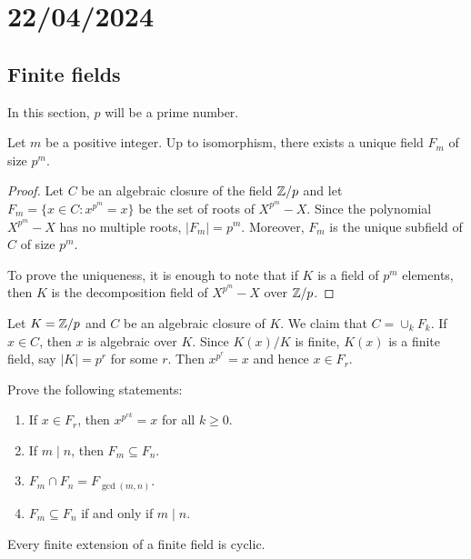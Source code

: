 \section{22/04/2024}

\subsection{Finite fields}

In this section, $p$ will be a prime number. 

\begin{proposition}
    Let $m$ be a positive integer. 
    Up to isomorphism, there exists a unique 
    field $F_m$ of size $p^m$. 
\end{proposition}

\begin{proof}
    Let $C$ be an algebraic closure of the field $\mathbb{Z}/p$ and 
    let $F_m=\{x\in C:x^{p^m}=x\}$ be the set of roots of $X^{p^m}-X$. Since 
    the polynomial $X^{p^m}-X$ has no multiple roots, $|F_m|=p^m$. Moreover, 
    $F_m$ is the unique subfield of $C$ of size $p^m$. 
    
    To prove the uniqueness, it is enough to note that 
    if $K$ is a field of $p^m$ elements, then
    $K$ is the decomposition field of $X^{p^m}-X$ over $\mathbb{Z}/p$.  
\end{proof}

Let $K=\mathbb{Z}/p$ and $C$ be an algebraic closure of $K$. 
We claim that $C=\cup_k F_k$. If $x\in C$, then $x$ is algebraic over $K$. 
Since $K(x)/K$ is finite, $K(x)$ is a finite field, say 
$|K|=p^r$ for some $r$. Then $x^{p^r}=x$ and hence $x\in F_r$. 

\begin{exercise}
    Prove the following statements:
    \begin{enumerate}
        \item If $x\in F_r$, then $x^{p^{rk}}=x$ for all $k\geq0$.
        \item If $m\mid n$, then $F_m\subseteq F_n$. 
        \item $F_m\cap F_n=F_{\gcd(m,n)}$.
        \item $F_m\subseteq F_n$ if and only if $m\mid n$. 
    \end{enumerate}
\end{exercise}

\begin{proposition}
    Every finite extension of a finite field is cyclic. 
\end{proposition}

